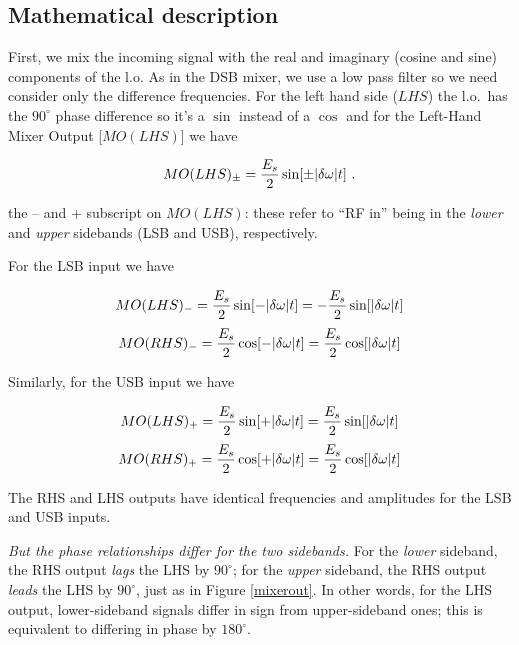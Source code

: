 \documentclass[11pt,preprint]{aastex}
\begin{document}
\subsection{Mathematical description} \label{mathdescr}

First, we mix the incoming signal with the real and imaginary (cosine
and sine) components of the l.o. As in the DSB mixer, we use a low pass
filter so we need consider only the difference frequencies. For the left
hand side ($LHS$) the l.o.\ has the $90^\circ$ phase difference so it's
a $\sin$ instead of a $\cos$ and for the Left-Hand Mixer Output
[$MO(LHS)$] we have

\begin{equation}
MO(LHS)_\pm = {E_s \over 2} \sin [\pm|\delta \omega | t] \ .
\end{equation}

 the -- and + subscript on $MO(LHS)$: these refer to
``RF in'' being in the {\it lower} and {\it upper} sidebands (LSB and
USB), respectively. 

For the LSB input we have

\begin{mathletters} \label{lsb}
\begin{equation}
MO(LHS)_- = {E_s \over 2} \sin [-|\delta \omega | t] =
   -{E_s \over 2} \sin [|\delta \omega | t]
\end{equation}
\begin{equation}
MO(RHS)_- = {E_s \over 2} \cos [-|\delta \omega | t] =
   {E_s \over 2} \cos [|\delta \omega | t]
\end{equation}
\end{mathletters}

\noindent Similarly, for the USB input we have

\begin{mathletters} \label{usb}
\begin{equation}
MO(LHS)_+ = {E_s \over 2} \sin [+|\delta \omega | t] =
   {E_s \over 2} \sin [|\delta \omega | t]
\end{equation}
\begin{equation}
MO(RHS)_+ = {E_s \over 2} \cos [+|\delta \omega | t] =
   {E_s \over 2} \cos [|\delta \omega | t]
\end{equation}
\end{mathletters}

\noindent The RHS and LHS outputs have identical frequencies and
amplitudes for the LSB and USB inputs. 

{\it But the phase relationships differ for the two sidebands.}  For the
{\it lower} sideband, the RHS output {\it lags} the LHS by $90^\circ$;
for the {\it upper} sideband, the RHS output {\it leads} the LHS by
$90^\circ$, just as in Figure \ref{mixerout}. In other words, for the
LHS output, lower-sideband signals differ in sign from upper-sideband
ones; this is equivalent to differing in phase by $180^\circ$.
\end{document}

